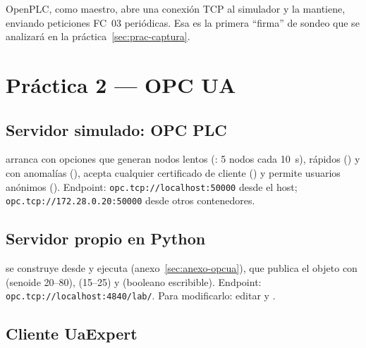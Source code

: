 \begin{nota}
OpenPLC, como maestro, abre una conexión TCP al simulador y la mantiene, enviando peticiones FC~03 periódicas. Esa es la primera ``firma'' de sondeo que se analizará en la práctica~\ref{sec:prac-captura}.
\end{nota}

\section{Práctica 2 --- OPC UA}
\label{sec:prac-opcua}

\subsection{Servidor simulado: OPC PLC}

 arranca con opciones que generan nodos lentos (: 5 nodos cada 10~s), rápidos () y con anomalías (), acepta cualquier certificado de cliente () y permite usuarios anónimos (). Endpoint: \nolinkurl{opc.tcp://localhost:50000} desde el host; \nolinkurl{opc.tcp://172.28.0.20:50000} desde otros contenedores.

\subsection{Servidor propio en Python}

 se construye desde  y ejecuta  (anexo~\ref{sec:anexo-opcua}), que publica el objeto  con  (senoide 20--80),  (15--25) y  (booleano escribible). Endpoint: \nolinkurl{opc.tcp://localhost:4840/lab/}. Para modificarlo: editar  y .

\subsection{Cliente UaExpert}

